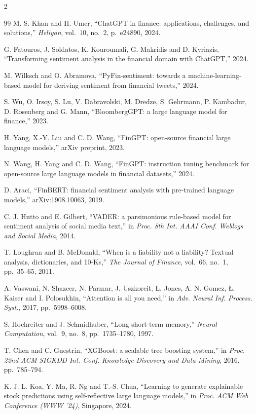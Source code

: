 \begin{footnotesize}
\begin{multicols}{2}
\begin{thebibliography}{99}
 M. S. Khan and H. Umer, ``ChatGPT in finance: applications,
challenges, and solutions,'' \emph{Heliyon}, vol.~10, no.~2, p.~e24890, 2024.

 G. Fatouros, J. Soldatos, K. Kouroumali, G. Makridis and
D. Kyriazis, ``Transforming sentiment analysis in the financial domain with ChatGPT,''
2024.

 M. Wilksch and O. Abramova, ``PyFin-sentiment: towards a
machine-learning-based model for deriving sentiment from financial tweets,'' 2024.

 S. Wu, O. Irsoy, S. Lu, V. Dabravolski, M. Dredze,
S. Gehrmann, P. Kambadur, D. Rosenberg and G. Mann, ``BloombergGPT: a large language model
for finance,'' 2023.

 H. Yang, X.-Y. Liu and C. D. Wang, ``FinGPT: open-source
financial large language models,'' arXiv preprint, 2023.

 N. Wang, H. Yang and C. D. Wang, ``FinGPT: instruction
tuning benchmark for open-source large language models in financial datasets,'' 2024.

 D. Araci, ``FinBERT: financial sentiment analysis with pre-trained
language models,'' arXiv:1908.10063, 2019.

 C. J. Hutto and E. Gilbert, ``VADER: a parsimonious rule-based model
for sentiment analysis of social media text,'' in \emph{Proc. 8th Int. AAAI Conf. Weblogs
and Social Media}, 2014.

 T. Loughran and B. McDonald, ``When is a liability not a liability?
Textual analysis, dictionaries, and 10-Ks,'' \emph{The Journal of Finance}, vol.~66,
no.~1, pp.~35--65, 2011.

 A. Vaswani, N. Shazeer, N. Parmar, J. Uszkoreit, L. Jones,
A. N. Gomez, {\L}. Kaiser and I. Polosukhin, ``Attention is all you need,'' in \emph{Adv.
Neural Inf. Process. Syst.}, 2017, pp.~5998--6008.

 S. Hochreiter and J. Schmidhuber, ``Long short-term memory,''
\emph{Neural Computation}, vol.~9, no.~8, pp.~1735--1780, 1997.

 T. Chen and C. Guestrin, ``XGBoost: a scalable tree boosting
system,'' in \emph{Proc. 22nd ACM SIGKDD Int. Conf. Knowledge Discovery and Data Mining},
2016, pp.~785--794.

 K. J. L. Koa, Y. Ma, R. Ng and T.-S. Chua, ``Learning to generate
explainable stock predictions using self-reflective large language models,'' in
\emph{Proc. ACM Web Conference (WWW '24)}, Singapore, 2024.


\end{thebibliography}
\end{multicols}
\end{footnotesize}
